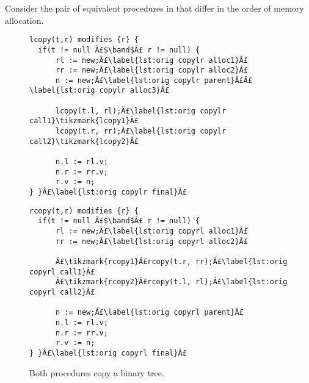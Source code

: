 \documentclass[runningheads,a4paper]{llncs}
\newcommand{\tikzmark}[1]{\tikz[overlay,remember picture] \node (#1) {};}
\DeclareMathOperator{\band}{\bm{\;\land\;}}
\begin{document}
Consider the pair of equivalent procedures in  that differ in the order of memory allocation.

\begin{figure}[htbp]%
\centering%
\noindent\begin{minipage}{.45\textwidth}%
\begin{lstlisting}[style=bl,label=lst:copylr,name=copyex]
lcopy(t,r) modifies {r} {
  if(t != null Â£$\band$Â£ r != null) {
      rl := new;Â£\label{lst:orig copylr alloc1}Â£
      rr := new;Â£\label{lst:orig copylr alloc2}Â£
      n := new;Â£\label{lst:orig copylr parent}Â£Â£\label{lst:orig copylr alloc3}Â£

      lcopy(t.l, rl);Â£\label{lst:orig copylr call1}\tikzmark{lcopy1}Â£
      lcopy(t.r, rr);Â£\label{lst:orig copylr call2}\tikzmark{lcopy2}Â£

      n.l := rl.v;
      n.r := rr.v;
      r.v := n;
} }Â£\label{lst:orig copylr final}Â£
\end{lstlisting}%
\end{minipage}%
\begin{minipage}{.45\textwidth}%
\begin{lstlisting}[style=bl,label=lst:copyrl,firstnumber=auto,name=copyex]
rcopy(t,r) modifies {r} {
  if(t != null Â£$\band$Â£ r != null) {
      rl := new;Â£\label{lst:orig copyrl alloc1}Â£
      rr := new;Â£\label{lst:orig copyrl alloc2}Â£

      Â£\tikzmark{rcopy1}Â£rcopy(t.r, rr);Â£\label{lst:orig copyrl call1}Â£
      Â£\tikzmark{rcopy2}Â£rcopy(t.l, rl);Â£\label{lst:orig copyrl call2}Â£

      n := new;Â£\label{lst:orig copyrl parent}Â£
      n.l := rl.v;
      n.r := rr.v;
      r.v := n;
} }Â£\label{lst:orig copyrl final}Â£
\end{lstlisting}%
\end{minipage}%
\caption[Two procedures, \copylr{} and \copyrl{}, that copy a binary tree]{Both procedures copy a binary tree.
\label{fig:copy tree}}%
%
\end{figure}
\end{document}

